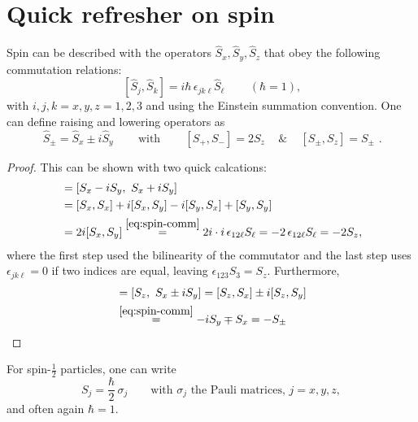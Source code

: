 \documentclass[../../../main.tex]{subfiles}
\begin{document}
\section{Quick refresher on spin}
\label{sec:spin-refresher}

Spin can be described with the operators $\hat S_x,\hat S_y,\hat S_z$ that obey the following
commutation relations:
\begin{equation}
\boxed{\,[\hat S_j,\hat S_k]=i\hbar\,\epsilon_{jk\ell}\hat S_\ell\,}\label{eq:spin-comm}
\qquad(\hbar=1),
\end{equation}
with $i,j,k=x,y,z=1,2,3$ and using the Einstein summation convention.
One can define raising and lowering operators as
\begin{equation}
\boxed{\,\hat S_\pm=\hat S_x\pm i\hat S_y\,}\qquad\text{with}\qquad
\boxed{\,[S_+,S_-]=2S_z\, \quad \& \quad \,[S_\pm,S_z]=S_\pm\,}\, .
\end{equation}

\begin{proof}
This can be shown with two quick calcations:
\begin{align*}
[S_-,S_+]&=[S_x-iS_y,\ S_x+iS_y]\\
&=
[S_x,S_x] +i[S_x,S_y]-i[S_y,S_x]+[S_y,S_y]\\
&=2i[S_x,S_y]
\overset{\eqref{eq:spin-comm}}{=}2i\cdot i\,\epsilon_{12\ell}S_\ell
=-2\,\epsilon_{12\ell}S_\ell
=-2S_z,
\end{align*}
where the first step used the bilinearity of the commutator and the last step uses $\epsilon_{jk\ell}=0$ if two indices are equal, leaving
$\epsilon_{123}S_3=S_z$. Furthermore,
\begin{align*}
[S_z,S_\pm]&=[S_z,\ S_x\pm iS_y] 
= [S_z,S_x] \pm i[S_z,S_y] \\
&\overset{\eqref{eq:spin-comm}}{=}-i S_y \mp S_x = - S_\pm
\end{align*}
\end{proof}

For spin-$\tfrac12$ particles, one can write
\begin{equation}
S_j=\frac{\hbar}{2}\,\sigma_j\qquad\text{with }\sigma_j\text{ the Pauli matrices, }j=x,y,z,
\end{equation}
and often again $\hbar=1$.
\end{document}

